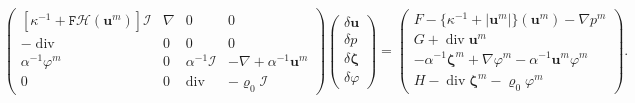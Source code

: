 \documentclass[11pt, reqno, a4paper, twoside]{article}
\newcommand{\bu}{\boldsymbol{u}}
\newcommand\bzeta{\boldsymbol{\zeta}}
\newcommand{\rF}{\mathtt{F}}
\newcommand\vdiv{\mathop{\mathrm{div}}\nolimits}
\numberwithin{equation}{section}
\numberwithin{remark}{section}
\numberwithin{figure}{section}
\numberwithin{table}{section}
\begin{document}
{\begin{equation}\label{eq:newton} 
\begin{pmatrix}[\kappa^{-1}+\rF 
\mathcal{H}({\bu}^m)]\mathcal{I} & \nabla&0&0 \\
    -\vdiv  &0 &0&0\\\alpha^{-1}\varphi^m&0&\alpha^{-1}\mathcal{I}&-\nabla+\alpha^{-1}\bu^m\\0&0&\vdiv&-\varrho_0\mathcal{I}
    \end{pmatrix}\begin{pmatrix}\delta \bu \\ \delta p\\\delta\bzeta\\\delta\varphi\end{pmatrix}= \begin{pmatrix}
      F - \{\kappa^{-1}+|\bu^m|\}({\bu}^m) - \nabla{p}^m \\ G +\vdiv{\bu}^m  \\-\alpha^{-1}\bzeta^m+\nabla\varphi^m-\alpha^{-1}\bu^m\varphi^m\\H-\vdiv\bzeta^m-\varrho_0\varphi^m
    \end{pmatrix}. \end{equation}} 
    
\end{document}
